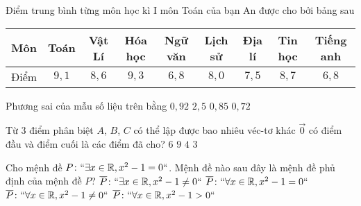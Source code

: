 \begin{ex}%
	Điểm trung bình từng môn học kì I môn Toán của bạn An được cho bởi bảng sau
	\begin{center}
		\begin{tabular}{|c|c|c|c|c|c|c|c|c|}
			\hline
			Môn&Toán&Vật Lí&Hóa học&Ngữ văn&Lịch sử&Địa lí&Tin học&Tiếng anh\\
			\hline
			Điểm&$9{,}1$&$8{,}6$&$9{,}3$&$6{,}8$&$8{,}0$&$7{,}5$&$8{,}7$&$6{,}8$\\
			\hline
		\end{tabular}
	\end{center}
	Phương sai của mẫu số liệu trên bằng
	\choice
	{$0{,}92$}
	{$2{,}5$}
	{\True $0{,}85$}
	{$0{,}72$}
\end{ex}
\begin{ex}%
	Từ 3 điểm phân biệt $A$, $B$, $C$ có thể lập được bao nhiêu véc-tơ khác $\vec{0}$ có điểm đầu và điểm cuối là các điểm đã cho?
	\choice
	{\True $6$}
	{$9$}
	{$4$}
	{$3$}
\end{ex}
\begin{ex}%
	Cho mệnh đề $P\colon\lq\lq\exists x\in\mathbb{R},x^2-1=0\lq\lq$. Mệnh đề nào sau đây là mệnh đề phủ định của mệnh đề $P$?
	\choice
	{$\overline{P}\colon\lq\lq\exists x\in\mathbb{R},x^2-1\ne0\lq\lq$}
	{$\overline{P}\colon\lq\lq\forall x\in\mathbb{R},x^2-1=0\lq\lq$}
	{\True $\overline{P}\colon\lq\lq\forall x\in\mathbb{R},x^2-1\ne0\lq\lq$}
	{$\overline{P}\colon\lq\lq\forall x\in\mathbb{R},x^2-1>0\lq\lq$}
\end{ex}
